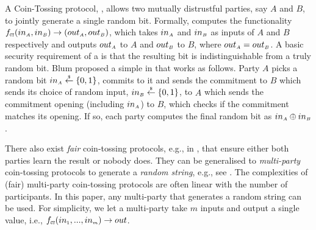 A Coin-Tossing protocol, \ct, allows two mutually distrustful parties, say $A$ and $B$, to jointly generate a single random bit. Formally, \ct computes the functionality $f_{\scriptscriptstyle \mathtt{CT}}(in_{\scriptscriptstyle A}, in_{\scriptscriptstyle B})\rightarrow (out_{\scriptscriptstyle A}, out_{\scriptscriptstyle B})$, which takes $in_{\scriptscriptstyle A}$ and  $in_{\scriptscriptstyle B}$ as inputs of $A$ and $B$ respectively and outputs $out_{\scriptscriptstyle A}$ to $A$ and $out_{\scriptscriptstyle B}$ to $B$, where $out_{\scriptscriptstyle A}=out_{\scriptscriptstyle B}$. A basic security requirement of a \ct is that the resulting bit is indistinguishable from a truly random bit. Blum proposed a simple \ct in \cite{Blum82} that works as follows. Party $A$ picks a random bit $in_{\scriptscriptstyle A}\stackrel{\scriptscriptstyle \$}\leftarrow\{0,1\}$, commits to it and sends the commitment to $B$ which sends its choice of random input, $in_{\scriptscriptstyle B}\stackrel{\scriptscriptstyle \$}\leftarrow\{0,1\}$, to $A$ which sends the commitment opening (including $in_{\scriptscriptstyle A}$) to $B$, which checks if the commitment matches its opening. If so, each party computes the final random bit as $in_{\scriptscriptstyle A}\oplus in_{\scriptscriptstyle B}$.  

There also exist \emph{fair} coin-tossing protocols, e.g., in \cite{MoranNS09}, that ensure either both parties learn the result or nobody does. They can be generalised to \emph{multi-party} coin-tossing protocols to generate a \emph{random string}, e.g., see \cite{BeimelOO10,KiayiasRDO17}.
%
The  complexities of (fair) multi-party coin-tossing protocols are often linear with the number of participants. In this paper, any multi-party \ct that generates a random string can be used. For simplicity, we let a multi-party \fct take $m$ inputs and output a single value, i.e., $f_{\scriptscriptstyle \mathtt{CT}}(in_{\scriptscriptstyle 1}, ..., in_{\scriptscriptstyle m})\rightarrow out$. 








